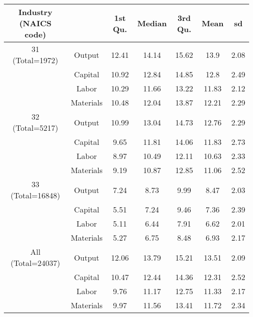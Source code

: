 \begin{table}[H]
\centering
\begin{tabular}{ccccccc}
  \hline\hline Industry (NAICS code) &   & 1st Qu. & Median & 3rd Qu. & Mean & sd \\ 
  \hline
31 (Total=1972) & Output & 12.41 & 14.14 & 15.62 & 13.9 & 2.08 \\ 
   & Capital & 10.92 & 12.84 & 14.85 & 12.8 & 2.49 \\ 
   & Labor & 10.29 & 11.66 & 13.22 & 11.83 & 2.12 \\ 
   & Materials & 10.48 & 12.04 & 13.87 & 12.21 & 2.29 \\ 
  32 (Total=5217) & Output & 10.99 & 13.04 & 14.73 & 12.76 & 2.29 \\ 
   & Capital & 9.65 & 11.81 & 14.06 & 11.83 & 2.73 \\ 
   & Labor & 8.97 & 10.49 & 12.11 & 10.63 & 2.33 \\ 
   & Materials & 9.19 & 10.87 & 12.85 & 11.06 & 2.52 \\ 
  33 (Total=16848) & Output & 7.24 & 8.73 & 9.99 & 8.47 & 2.03 \\ 
   & Capital & 5.51 & 7.24 & 9.46 & 7.36 & 2.39 \\ 
   & Labor & 5.11 & 6.44 & 7.91 & 6.62 & 2.01 \\ 
   & Materials & 5.27 & 6.75 & 8.48 & 6.93 & 2.17 \\ 
  All (Total=24037) & Output & 12.06 & 13.79 & 15.21 & 13.51 & 2.09 \\ 
   & Capital & 10.47 & 12.44 & 14.36 & 12.31 & 2.52 \\ 
   & Labor & 9.76 & 11.17 & 12.75 & 11.33 & 2.17 \\ 
   & Materials & 9.97 & 11.56 & 13.41 & 11.72 & 2.34 \\ 
   \hline
\end{tabular}
\end{table}
